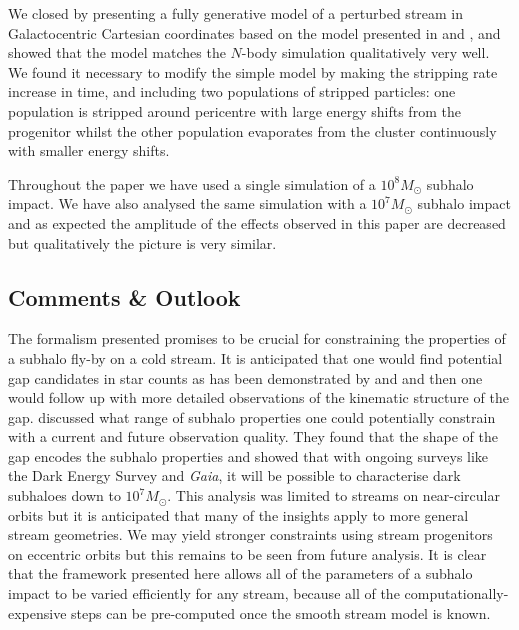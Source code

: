 \documentclass[useAMS,usenatbib,fleqn,a4paper]{mn2e}
\begin{document}
We closed by presenting a fully generative model of a perturbed stream in Galactocentric Cartesian coordinates based on the model presented in \cite{Bovy2014} and \cite{Sanders2014}, and showed that the model matches the $N$-body simulation qualitatively very well. We found it necessary to modify the simple model by making the stripping rate increase in time, and including two populations of stripped particles: one population is stripped around pericentre with large energy shifts from the progenitor whilst the other population evaporates from the cluster continuously with smaller energy shifts.

Throughout the paper we have used a single simulation of a $10^8M_\odot$ subhalo impact. We have also analysed the same simulation with a $10^7M_\odot$ subhalo impact and as expected the amplitude of the effects observed in this paper are decreased but qualitatively the picture is very similar.

\subsection{Comments \& Outlook}

The formalism presented promises to be crucial for constraining the properties of a subhalo fly-by on a cold stream. It is anticipated that one would find potential gap candidates in star counts as has been demonstrated by \citet{CarlbergPal52012} and \citet{CarlbergGD12013} and then one would follow up with more detailed observations of the kinematic structure of the gap. \cite{ErkalBelokurov2015b} discussed what range of subhalo properties one could potentially constrain with a current and future observation quality. They found that the shape of the gap encodes the subhalo properties and showed that with ongoing surveys like the Dark Energy Survey and \textit{Gaia}, it will be possible to characterise dark subhaloes down to $10^7M_\odot$. This analysis was limited to streams on near-circular orbits but it is anticipated that many of the insights apply to more general stream geometries. We may yield stronger constraints using stream progenitors on eccentric orbits but this remains to be seen from future analysis. It is clear that the framework presented here allows all of the parameters of a subhalo impact to be varied efficiently for any stream, because all of the computationally-expensive steps can be pre-computed once the smooth stream model is known.
\end{document}
